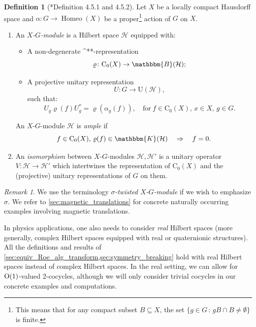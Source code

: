 \documentclass{amsart}
\numberwithin{figure}{section}
\numberwithin{equation}{section}
\numberwithin{table}{section}
\theoremstyle{plain}
\theoremstyle{definition}
\newtheorem{definition}[equation]{Definition}
\theoremstyle{remark}
\newtheorem{remark}[equation]{Remark}
\theoremstyle{nonumber}
\newcommand{\Cpt}{\mathbb{K}}
\newcommand{\Bdd}{\mathbb{B}}
\newcommand{\st}{\relax\ifmmode{}^*\else{}\textup{*}\fi}
\newcommand{\Co}{\mathrm{C}_0}
\renewcommand{\mathbb}{\mathbbm} %
\begin{document}
\begin{definition}[\cite{Willett-Yu:Higher_index_theory}*{Definition 4.5.1
and 4.5.2}]\label{dfn:XG_module}
Let \( X \) be a locally compact Hausdorff space
and \( \alpha\colon G\to\operatorname{Homeo}(X) \) 
be a proper\footnote{This means that for
any compact subset $B\subseteq X$, the set $\{g\in G\,:\,gB\cap B\neq
\emptyset\}$ is finite.} action of \( G \) on \( X \).
\begin{enumerate}
\item An \emph{\( X \)-\( G \)-module} is a Hilbert space $\mathcal{H}$ equipped with:
\begin{itemize}
\item A non-degenerate \st-representation 
\[
\varrho\colon \Co(X)\to\Bdd(\mathcal{H});
\]
\item A projective unitary representation
\[
  U\colon G\to\mathrm{U}(\mathcal{H}),
\]
such that:
\begin{equation}\label{eq:equiv_Xmod}
U_g\varrho(f)U_g^*=\varrho(\alpha_g(f)),\quad
\text{for}\ f\in\Co(X),\, x\in X,\, g\in G.
\end{equation}
\end{itemize}
An \( X \)-\( G \)-module $\mathcal{H}$ is \emph{ample} if 
\[
f\in\Co(X),\,\varrho(f)\in\Cpt(\mathcal{H})\quad\Rightarrow\quad f=0.
\]
\item An \emph{isomorphism} between \( X \)-\( G \)-modules \(
\mathcal{H},\mathcal{H}' \)  is a
unitary operator \( V\colon \mathcal{H}\to\mathcal{H}' \)
which intertwines the representation of \( \Co(X) \) and the (projective) 
unitary representations of \( G \) on them.
\end{enumerate}
\end{definition}

\begin{remark}
We use the terminology
\emph{$\sigma$-twisted $X$-$G$-module} if we wish to emphasize $\sigma$.
We refer to \cref{sec:magnetic_translations} 
for concrete naturally occurring examples
involving magnetic translations.

In physics applications, one also needs to consider \emph{real} Hilbert spaces
(more generally, complex Hilbert spaces equipped with real or quaternionic
structures). All the definitions and results of
\cref{sec:equiv_Roe_alg_transform,sec:symmetry_breaking} hold with
real Hilbert spaces instead of complex Hilbert spaces. In the real setting,
we can allow for ${\rm O}(1)$-valued 2-cocycles, although we will only
consider trivial cocycles in our concrete examples and computations.
\end{remark}
\end{document}
